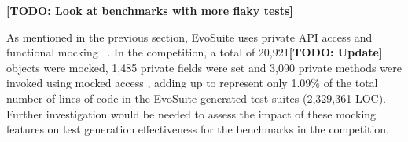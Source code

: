 \documentclass[sigconf,table]{acmart}
\newcommand{\TODO}[1]{\textbf{\textcolor{ScarletRed}{[TODO: #1]}}\xspace}
\newcommand{\TODO}[1]{}
\newcommand{\EVOSUITE}{{\sc EvoSuite}\xspace}
\begin{document}

\TODO{Look at benchmarks with more flaky tests}

As mentioned in the previous section, \EVOSUITE uses private API
access and functional mocking%
~\cite{ICST_Mocking17}. In the competition, a total of 20,921\TODO{Update}
objects were mocked, 1,485 private fields were set and 3,090 private methods
were invoked using mocked access%
, adding up to represent only 1.09\% of the total number of lines of
code in the \EVOSUITE-generated test suites (2,329,361 LOC). Further
investigation would be needed to assess the impact of these mocking
features on test generation effectiveness for the benchmarks in the
competition.
\end{document}

